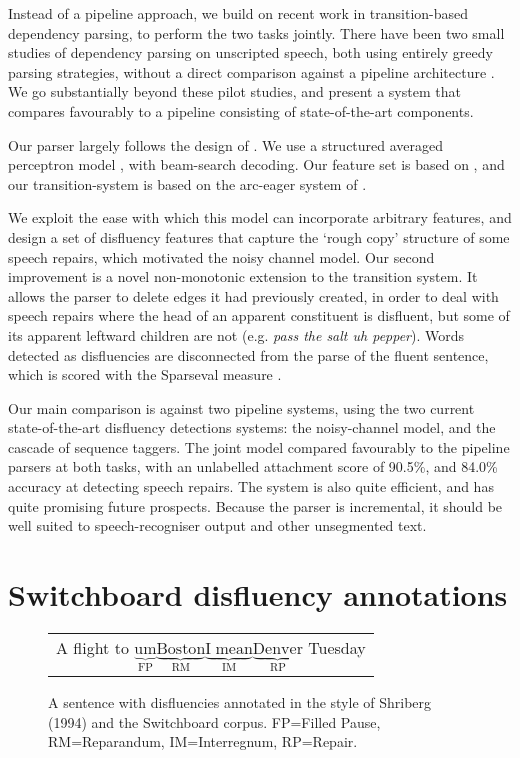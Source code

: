 \documentclass[11pt,letterpaper]{article}
\begin{document}
Instead of a pipeline approach, we build on recent work in transition-based dependency
parsing, to perform the two tasks jointly.
There have been two small studies of dependency parsing on unscripted speech,
both using entirely greedy parsing strategies, without a direct comparison
against a pipeline architecture \citep{jorgensen:07,rasooli:13}.  We go substantially
beyond these pilot studies, and present a system that compares favourably to a
pipeline consisting of state-of-the-art components.

Our parser largely follows the design of \citet{zhang:cl11}. We use a structured averaged
perceptron model \citep{collins:02}, with beam-search decoding. Our feature set
is based on \citet{zhang:cl11}, and our transition-system is based on the arc-eager
system of \citet{nivre:03}.

We exploit the ease with which this model can incorporate arbitrary features,
and design a set of disfluency features that capture the
`rough copy' structure of some speech repairs, which motivated the
\citet{Johnson04a} noisy channel model.
Our second improvement is a novel non-monotonic extension to the transition
system. It allows the parser to delete edges it had previously created, in order
to deal with speech repairs where the head of an apparent constituent is disfluent,
but some of its apparent leftward children are not (e.g. \emph{pass the salt uh pepper}).
Words detected as disfluencies are disconnected from the parse of the fluent sentence,
which is scored with the Sparseval measure \citep{sparseval}.

Our main comparison is against two pipeline systems, using the two current 
state-of-the-art disfluency detections systems: the \citet{Johnson04a} noisy-channel
model, and the \citet{qian:13} cascade of sequence taggers.  The joint model
compared favourably to the pipeline parsers at both tasks, with an unlabelled
attachment score of 90.5\%, and 84.0\% accuracy at detecting speech repairs.
The system is also quite efficient, and has quite promising future prospects.
Because the parser is incremental, it should be well suited
to speech-recogniser output and other unsegmented text.

\section{Switchboard disfluency annotations}
\label{sec:swbd}

\begin{figure}
    \begin{tabular}{l}

        A flight to $\underbrace{\mathrm{um}}_\text{FP} \underbrace{\mathrm{Boston}}_\text{RM} \underbrace{\mathrm{I\;mean}}_\text{IM} \underbrace{\mathrm{Denver}}_\text{RP}$ Tuesday\\

\end{tabular}
\caption{\small A sentence with disfluencies annotated in the style of Shriberg (1994) 
    and the Switchboard corpus.
FP=Filled Pause, RM=Reparandum, IM=Interregnum, RP=Repair.\label{fig:shriberg}}
\end{figure}
\end{document}
